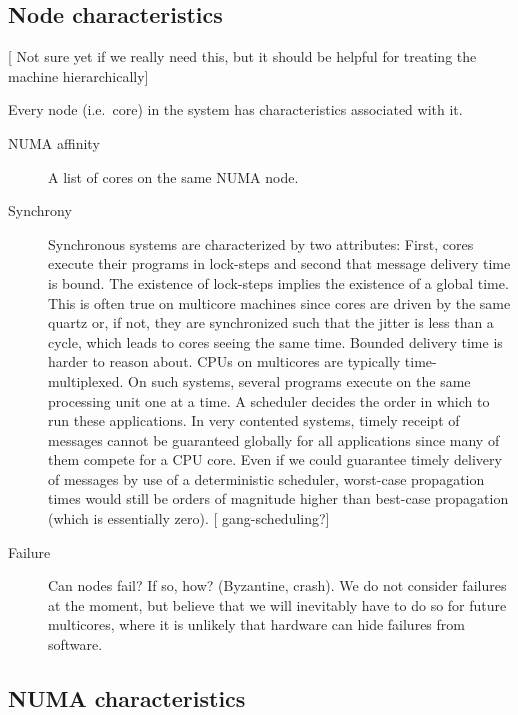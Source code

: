 \documentclass{article}
\newcommand{\stefan}[1]{
  {\color{skRed}[{\color{red}{SK}} #1]}}
\begin{document}
\subsection{Node characteristics} 
\label{sec:model_nodes}

\stefan{Not sure yet if we really need this, but it should be helpful
  for treating the machine hierarchically}

Every node (i.e.\ core) in the system has characteristics associated
with it.

\begin{description}
\item[NUMA affinity] A list of cores on the same NUMA node.
\item[Synchrony] Synchronous systems are characterized by two
  attributes: First, cores execute their programs in lock-steps and
  second that message delivery time is bound.
  The existence of lock-steps implies the existence of a global time.
  This is often true on multicore machines since cores are driven by
  the same quartz or, if not, they are synchronized such that the
  jitter is less than a cycle, which leads to cores seeing the same
  time. %
  Bounded delivery time is harder to reason about. CPUs on multicores
  are typically time-multiplexed. On such systems, several programs
  execute on the same processing unit one at a time. A scheduler
  decides the order in which to run these applications. In very
  contented systems, timely receipt of messages cannot be guaranteed
  globally for all applications since many of them compete for a CPU
  core. Even if we could guarantee timely delivery of messages by use
  of a deterministic scheduler, worst-case propagation times would
  still be orders of magnitude higher than best-case propagation
  (which is essentially zero). \stefan{gang-scheduling?}
\item[Failure] Can nodes fail? If so, how? (Byzantine, crash). We do
  not consider failures at the moment, but believe that we will
  inevitably have to do so for future multicores, where it is unlikely
  that hardware can hide failures from software.
\end{description}

\subsection{NUMA characteristics}
\label{sec:model_numa_nodes}
\end{document}
